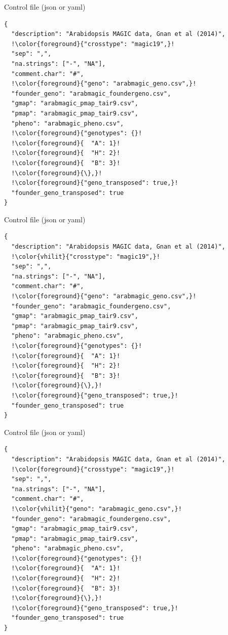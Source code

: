 \documentclass[12pt,t,aspectratio=169]{beamer}
\begin{document}
\begin{frame}[c,fragile]{Control file (json or yaml)}
\begin{semiverbatim} \begin{lstlisting}[escapechar=!,]
{
  "description": "Arabidopsis MAGIC data, Gnan et al (2014)",
  !\color{foreground}{"crosstype": "magic19",}!
  "sep": ",",
  "na.strings": ["-", "NA"],
  "comment.char": "#",
  !\color{foreground}{"geno": "arabmagic_geno.csv",}!
  "founder_geno": "arabmagic_foundergeno.csv",
  "gmap": "arabmagic_pmap_tair9.csv",
  "pmap": "arabmagic_pmap_tair9.csv",
  "pheno": "arabmagic_pheno.csv",
  !\color{foreground}{"genotypes": {}!
  !\color{foreground}{  "A": 1}!
  !\color{foreground}{  "H": 2}!
  !\color{foreground}{  "B": 3}!
  !\color{foreground}{\},}!
  !\color{foreground}{"geno_transposed": true,}!
  "founder_geno_transposed": true
}
\end{lstlisting} \end{semiverbatim}
\end{frame}


\begin{frame}[c,fragile]{Control file (json or yaml)}
\addtocounter{framenumber}{-1}
\begin{semiverbatim} \begin{lstlisting}[escapechar=!]
{
  "description": "Arabidopsis MAGIC data, Gnan et al (2014)",
  !\color{vhilit}{"crosstype": "magic19",}!
  "sep": ",",
  "na.strings": ["-", "NA"],
  "comment.char": "#",
  !\color{foreground}{"geno": "arabmagic_geno.csv",}!
  "founder_geno": "arabmagic_foundergeno.csv",
  "gmap": "arabmagic_pmap_tair9.csv",
  "pmap": "arabmagic_pmap_tair9.csv",
  "pheno": "arabmagic_pheno.csv",
  !\color{foreground}{"genotypes": {}!
  !\color{foreground}{  "A": 1}!
  !\color{foreground}{  "H": 2}!
  !\color{foreground}{  "B": 3}!
  !\color{foreground}{\},}!
  !\color{foreground}{"geno_transposed": true,}!
  "founder_geno_transposed": true
}
\end{lstlisting} \end{semiverbatim}
\end{frame}



\begin{frame}[c,fragile]{Control file (json or yaml)}
\addtocounter{framenumber}{-1}
\begin{semiverbatim} \begin{lstlisting}[escapechar=!]
{
  "description": "Arabidopsis MAGIC data, Gnan et al (2014)",
  !\color{foreground}{"crosstype": "magic19",}!
  "sep": ",",
  "na.strings": ["-", "NA"],
  "comment.char": "#",
  !\color{vhilit}{"geno": "arabmagic_geno.csv",}!
  "founder_geno": "arabmagic_foundergeno.csv",
  "gmap": "arabmagic_pmap_tair9.csv",
  "pmap": "arabmagic_pmap_tair9.csv",
  "pheno": "arabmagic_pheno.csv",
  !\color{foreground}{"genotypes": {}!
  !\color{foreground}{  "A": 1}!
  !\color{foreground}{  "H": 2}!
  !\color{foreground}{  "B": 3}!
  !\color{foreground}{\},}!
  !\color{foreground}{"geno_transposed": true,}!
  "founder_geno_transposed": true
}
\end{lstlisting} \end{semiverbatim}
\end{frame}
\end{document}
